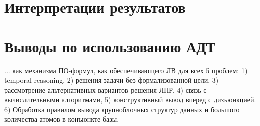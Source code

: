 \section{Интерпретации результатов}

\section{Выводы по использованию АДТ}

... как механизма ПО-формул, как обеспечивающего ЛВ для всех 5 проблем: 1) temporal reasoning, 2) решения задачи без формализованной цели, 3) рассмотрение альтернативных вариантов решения ЛПР, 4) связь с вычислительными алгоритмами, 5) конструктивный вывод вперед с дизъюнкцией. 6) Обработка правилом вывода крупноблочных структур данных и большого количества атомов в конъюнкте базы.
